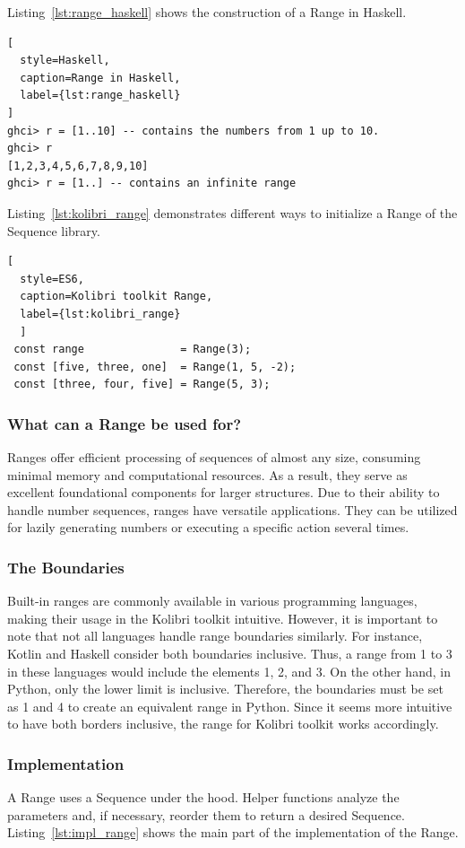 Listing~\ref{lst:range_haskell} shows the construction of a Range in Haskell.
\begin{lstlisting}[
  style=Haskell,
  caption=Range in Haskell,
  label={lst:range_haskell}
]
ghci> r = [1..10] -- contains the numbers from 1 up to 10.
ghci> r
[1,2,3,4,5,6,7,8,9,10]
ghci> r = [1..] -- contains an infinite range
\end{lstlisting}

Listing~\ref{lst:kolibri_range} demonstrates different ways to initialize a
Range of the Sequence library.

\begin{lstlisting}[
  style=ES6, 
  caption=Kolibri toolkit Range,
  label={lst:kolibri_range}
  ]
 const range               = Range(3);
 const [five, three, one]  = Range(1, 5, -2);
 const [three, four, five] = Range(5, 3);
\end{lstlisting}

\subsubsection{What can a Range be used for?}
\label{subsub:What can a Range be used for?}
Ranges offer efficient processing of sequences of almost any size, consuming
minimal memory and computational resources. As a result, they serve as
excellent foundational components for larger structures. Due to their ability
to handle number sequences, ranges have versatile applications. They can be
utilized for lazily generating numbers or executing a specific action several
times.

\subsubsection{The Boundaries}
\label{subsub:The Boundaries}
Built-in ranges are commonly available in various programming languages, making
their usage in the Kolibri toolkit intuitive. However, it is important to note
that not all languages handle range boundaries similarly. For instance, Kotlin
and Haskell consider both boundaries inclusive. Thus, a range from 1 to 3 in
these languages would include the elements 1, 2, and 3. On the other hand, in
Python, only the lower limit is inclusive. Therefore, the boundaries must be
set as 1 and 4 to create an equivalent range in Python.
Since it seems more intuitive to have both borders inclusive, the range for
Kolibri toolkit works accordingly.

\subsubsection{Implementation}
\label{subsub:Implementation}
A Range uses a Sequence under the hood. Helper functions analyze the parameters
and, if necessary, reorder them to return a desired Sequence. Listing~\ref{lst:impl_range} shows the
main part of the implementation of the Range. 

